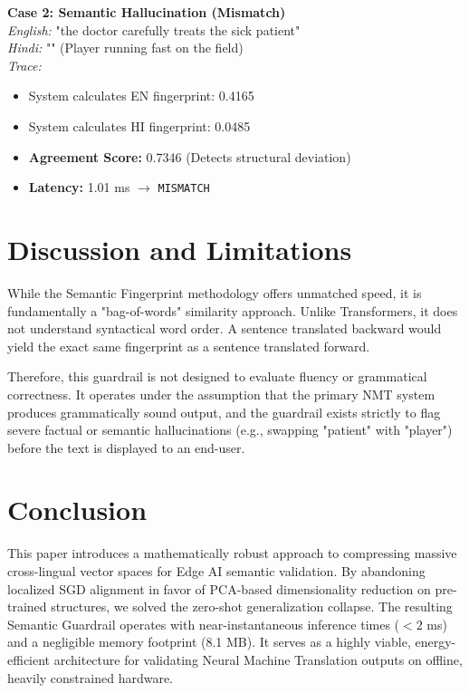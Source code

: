 \documentclass[conference]{IEEEtran}
\begin{document}
\vspace{0.2cm}
\noindent \textbf{Case 2: Semantic Hallucination (Mismatch)} \\
\textit{English:} "the doctor carefully treats the sick patient" \\
\textit{Hindi:} "" (Player running fast on the field) \\
\textit{Trace:}
\begin{itemize}
    \item System calculates EN fingerprint: 0.4165
    \item System calculates HI fingerprint: 0.0485
    \item \textbf{Agreement Score:} 0.7346 (Detects structural deviation)
    \item \textbf{Latency:} 1.01 ms $\rightarrow$ \texttt{MISMATCH}
\end{itemize}

\section{Discussion and Limitations}
While the Semantic Fingerprint methodology offers unmatched speed, it is fundamentally a "bag-of-words" similarity approach. Unlike Transformers, it does not understand syntactical word order. A sentence translated backward would yield the exact same fingerprint as a sentence translated forward. 

Therefore, this guardrail is not designed to evaluate fluency or grammatical correctness. It operates under the assumption that the primary NMT system produces grammatically sound output, and the guardrail exists strictly to flag severe factual or semantic hallucinations (e.g., swapping "patient" with "player") before the text is displayed to an end-user.

\section{Conclusion}
This paper introduces a mathematically robust approach to compressing massive cross-lingual vector spaces for Edge AI semantic validation. By abandoning localized SGD alignment in favor of PCA-based dimensionality reduction on pre-trained structures, we solved the zero-shot generalization collapse. The resulting Semantic Guardrail operates with near-instantaneous inference times ($< 2$ ms) and a negligible memory footprint (8.1 MB). It serves as a highly viable, energy-efficient architecture for validating Neural Machine Translation outputs on offline, heavily constrained hardware.
\end{document}
